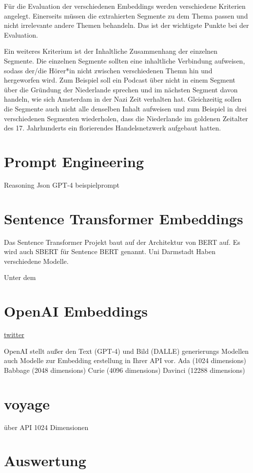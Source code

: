 Für die Evaluation der verschiedenen Embeddings werden verschiedene Kriterien angelegt.
Einerseits müssen die extrahierten Segmente zu dem Thema passen und nicht irrelevante andere Themen behandeln.
Das ist der wichtigste Punkte bei der Evaluation.

Ein weiteres Kriterium ist der Inhaltliche Zusammenhang der einzelnen Segmente.
Die einzelnen Segmente sollten eine inhaltliche Verbindung aufweisen, sodass der/die Hörer*in nicht zwischen verschiedenen Themn hin und hergeworfen wird.
Zum Beispiel soll ein Podcast über  nicht in einem Segment über die Gründung der Niederlande sprechen und im nächsten Segment davon handeln, wie sich Amsterdam in der Nazi Zeit verhalten hat.
Gleichzeitig sollen die Segmente auch nicht alle denselben Inhalt aufweisen und zum Beispiel in drei verschiedenen Segmenten wiederholen, dass die Niederlande im goldenen Zeitalter des 17. Jahrhunderts ein florierendes Handelsnetzwerk aufgebaut hatten.
 


\section{Prompt Engineering}

Reasoning
Json
GPT-4
beispielprompt


 


\section{Sentence Transformer Embeddings}

Das Sentence Transformer Projekt baut auf der Architektur von BERT auf. 
Es wird auch SBERT für Sentence BERT genannt. 
Uni Darmstadt
Haben verschiedene Modelle.

Unter dem 


\section{OpenAI Embeddings}

\href{https://twitter.com/Nils_Reimers/status/1487014195568775173}{twitter}

OpenAI stellt außer den Text (GPT-4) und Bild (DALLE) generierungs Modellen auch Modelle zur Embedding erstellung in Ihrer API vor.
Ada (1024 dimensions)
Babbage (2048 dimensions)
Curie (4096 dimensions)
Davinci (12288 dimensions)

\section{voyage}

über API
1024 Dimensionen


\section{Auswertung}



